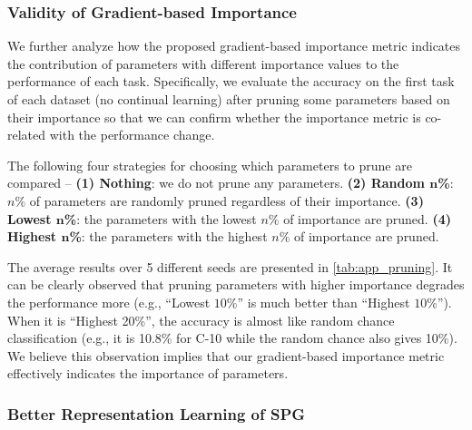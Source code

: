 


















\subsubsection{Validity of Gradient-based Importance}


We further analyze how the proposed gradient-based importance metric
indicates the contribution of parameters with different importance values to the performance of each task. Specifically, we evaluate the accuracy on the first task of each dataset (no continual learning) 
after pruning some parameters based on their importance so that we can confirm whether the importance metric is co-related with the performance change.

The following four strategies for choosing which parameters to prune are compared --
\textbf{(1) Nothing}: 
we do not prune any parameters. 
\textbf{(2) Random $\bm{n}$\%}: 
$n\%$ of parameters are randomly pruned regardless of their importance.
\textbf{(3) Lowest $\bm{n}$\%}: 
the parameters with the lowest $n\%$ of importance are pruned.
\textbf{(4) Highest $\bm{n}$\%}:
the parameters with the highest $n\%$ of importance are pruned.


The average results over 5 different seeds are presented in \cref{tab:app_pruning}.
It can be clearly observed that pruning parameters with higher importance degrades the performance more (e.g., ``Lowest $10$\%'' is much better than ``Highest $10$\%''). When it is ``Highest 20\%'', the accuracy is almost like random chance classification (e.g., it is 10.8\% for C-10 while the random chance also gives 10\%). We believe this observation implies that our gradient-based importance metric effectively indicates the importance of parameters.










\subsubsection{Better Representation Learning of SPG}

